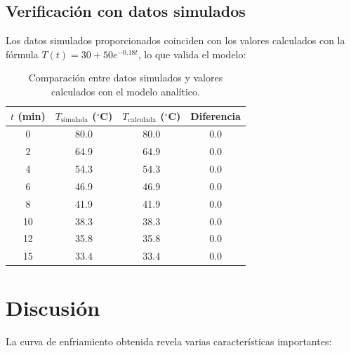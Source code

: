 \documentclass[12pt,a4paper]{article}
\begin{document}
\subsection{Verificación con datos simulados}

Los datos simulados proporcionados coinciden con los valores calculados con la fórmula \(T(t)=30+50e^{-0.18t}\), lo que valida el modelo:

\begin{table}[H]
  \centering
  \begin{tabular}{cccc}
    \toprule
    \(t\) (min) & \(T_{\text{simulada}}\) (\({}^\circ\)C) & \(T_{\text{calculada}}\) (\({}^\circ\)C) & Diferencia \\
    \midrule
    0  & 80.0 & 80.0 & 0.0 \\
    2  & 64.9 & 64.9 & 0.0 \\
    4  & 54.3 & 54.3 & 0.0 \\
    6  & 46.9 & 46.9 & 0.0 \\
    8  & 41.9 & 41.9 & 0.0 \\
    10 & 38.3 & 38.3 & 0.0 \\
    12 & 35.8 & 35.8 & 0.0 \\
    15 & 33.4 & 33.4 & 0.0 \\
    \bottomrule
  \end{tabular}
  \caption{Comparación entre datos simulados y valores calculados con el modelo analítico.}
\end{table}

\section{Discusión}

La curva de enfriamiento obtenida revela varias características importantes:
\end{document}
